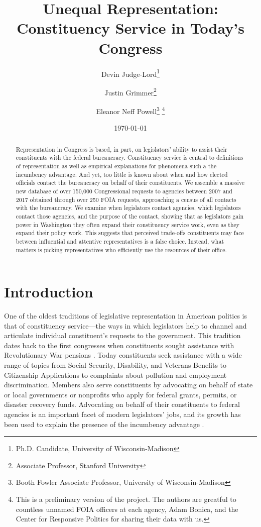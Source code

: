 \documentclass{article}
\title{Unequal Representation: Constituency Service in Today's Congress}
\author{Devin Judge-Lord\thanks{Ph.D. Candidate, University of Wisconsin-Madison}\and Justin Grimmer\thanks{Associate Professor, Stanford University} \and Eleanor Neff Powell\thanks{Booth Fowler Associate Professor, University of Wisconsin-Madison} \thanks{This is a preliminary version of the project.  The authors are greatful to countless unnamed FOIA officers at each agency, Adam Bonica, and the Center for Responsive Politics for sharing their data with us. }}
\date{\today}
\begin{document}
\maketitle


\begin{abstract}
\noindent Representation in Congress is based, in part, on legislators' ability to assist their constituents with the federal bureaucracy.  Constituency service is central to definitions of representation as well as empirical explanations for phenomena such a the incumbency advantage. And yet, too little is known about when and how elected officials contact the bureaucracy on behalf of their constituents. We assemble a massive new database of over 150,000 Congressional requests to agencies between 2007 and 2017 obtained through over 250 FOIA requests, approaching a census of all contacts with the bureaucracy. We examine when legislators contact agencies, which legislators contact those agencies, and the purpose of the contact, showing that as legislators gain power in Washington they often expand their constituency service work, even as they expand their policy work. This suggests that perceived trade-offs constituents may face between influential and attentive representatives is a false choice.  Instead, what matters is picking representatives who efficiently use the resources of their office. %
\end{abstract}

\newpage
\doublespacing
\section{Introduction}

One of the oldest traditions of legislative representation in American politics is that of constituency service---the ways in which legislators help to channel and articulate individual constituent's requests to the government. This tradition dates back to the first congresses when constituents sought assistance with Revolutionary War pensions \citep{Eckman2017}. Today constituents seek assistance with a wide range of topics from Social Security, Disability, and Veterans Benefits to Citizenship Applications to complaints about pollution and employment discrimination. Members also serve constituents by advocating on behalf of state or local governments or nonprofits who apply for federal grants, permits, or disaster recovery funds. %
Advocating on behalf of their constituents to federal agencies is an important facet of modern legislators' jobs, and its growth has been used to explain the presence of the incumbency advantage \citep{King1991}.  
\end{document}
